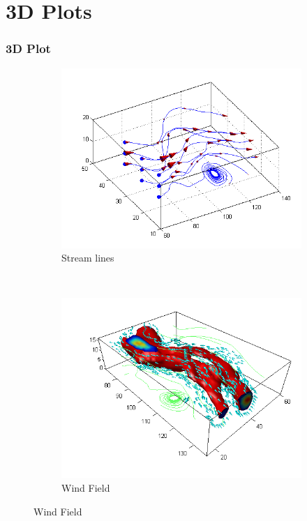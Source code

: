 \documentclass[compress]{beamer}  %
\begin{document}
\section{3D Plots}
\begin{frame}[fragile]
\frametitle{3D Plot}
\begin{figure}
        \begin{subfigure}[b]{0.4\textwidth}
                \centering
                \includegraphics[width=\textwidth]{Streamline_01.png}
                \caption{Stream lines\cite{matlab_gallery} }
        \end{subfigure}%
        ~
        \begin{subfigure}[b]{0.4\textwidth}
                \centering
                \includegraphics[width=\textwidth]{Wind_01.png}
                \caption{Wind Field\cite{matlab_gallery}}
        \end{subfigure}
\end{figure}

\end{frame}
\end{document}
